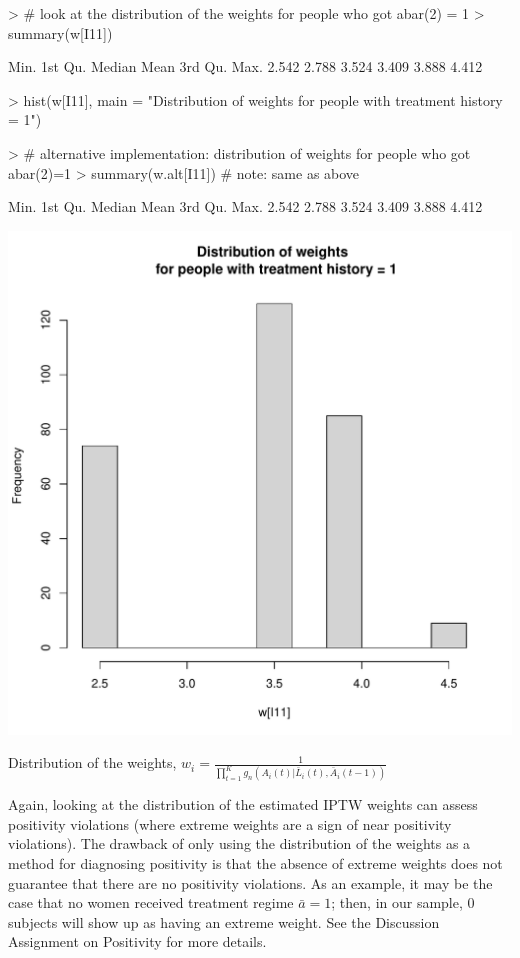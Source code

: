\documentclass[answers]{exam}
\newenvironment{myfigure}{\captionsetup{type=mytype}}{}
\begin{document}
\begin{enumerate}
\begin{solution}
\begin{Schunk}
\begin{Sinput}
> # look at the distribution of the weights for people who got abar(2) = 1 
> summary(w[I11])
\end{Sinput}
\begin{Soutput}
   Min. 1st Qu.  Median    Mean 3rd Qu.    Max. 
  2.542   2.788   3.524   3.409   3.888   4.412 
\end{Soutput}
\begin{Sinput}
> hist(w[I11], main = "Distribution of weights \n for people with treatment history = 1")
\end{Sinput}
\end{Schunk}
\begin{Schunk}
\begin{Sinput}
> # alternative implementation: distribution of weights for people who got abar(2)=1
> summary(w.alt[I11]) # note: same as above
\end{Sinput}
\begin{Soutput}
   Min. 1st Qu.  Median    Mean 3rd Qu.    Max. 
  2.542   2.788   3.524   3.409   3.888   4.412 
\end{Soutput}
\end{Schunk}
\begin{myfigure}
\begin{center}
\includegraphics[width=.4\textwidth]{w11Hist0.pdf}
\caption{Distribution of the weights, $w_i = \frac{1}{\prod_{t=1}^Kg_n(A_i(t)|\bar{L}_i(t), \bar{A}_i(t-1))}$}
\label{Fig:w11Hist0}
\end{center}
\end{myfigure}

Again, looking at the distribution of the estimated IPTW weights can assess positivity violations (where extreme weights are a sign of near positivity violations). The drawback of only using the distribution of the weights as a method for diagnosing positivity is that the absence of extreme weights does not guarantee that there are no positivity violations. As an example, it may be the case that no women received treatment regime $\bar{a}=1$; then, in our sample, 0 subjects will show up as having an extreme weight. See the Discussion Assignment on Positivity for more details. 


\end{solution}
\end{enumerate}
\end{document}
